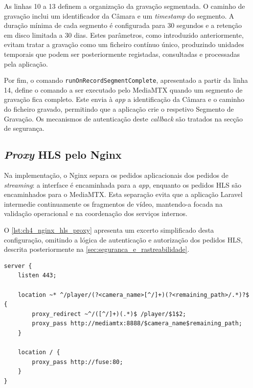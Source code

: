As linhas 10 a 13 definem a organização da gravação segmentada. O caminho de gravação inclui um identificador da Câmara e um \textit{timestamp} do segmento. A duração mínima de cada segmento é configurada para 30 segundos e a retenção em disco limitada a 30 dias. Estes parâmetros, como introduzido anteriormente, evitam tratar a gravação como um ficheiro contínuo único, produzindo unidades temporais que podem ser posteriormente registadas, consultadas e processadas pela aplicação.

Por fim, o comando \texttt{runOnRecordSegmentComplete}, apresentado a partir da linha 14, define o comando a ser executado pelo MediaMTX quando um segmento de gravação fica completo. Este envia à \textit{app} a identificação da Câmara e o caminho do ficheiro gravado, permitindo que a aplicação crie o respetivo Segmento de Gravação. Os mecanismos de autenticação deste \textit{callback} são tratados na secção de segurança.

\subsection{\textit{Proxy} HLS pelo Nginx}
\label{sec:ch4_nginx_hls_proxy}

Na implementação, o Nginx separa os pedidos aplicacionais dos pedidos de \textit{streaming}: a interface é encaminhada para a \textit{app}, enquanto os pedidos \gls{HLS} são encaminhados para o MediaMTX. Esta separação evita que a aplicação Laravel intermedie continuamente os fragmentos de vídeo, mantendo-a focada na validação operacional e na coordenação dos serviços internos.

O \autoref{lst:ch4_nginx_hls_proxy} apresenta um excerto simplificado desta configuração, omitindo a lógica de autenticação e autorização dos pedidos \gls{HLS}, descrita posteriormente na \autoref{sec:seguranca_e_rastreabilidade}.

\par\noindent\begin{minipage}{\linewidth}
\begin{lstlisting}[caption={\textit{Proxy} funcional de pedidos aplicacionais e HLS no Nginx (nginx)},label={lst:ch4_nginx_hls_proxy}]
server {
    listen 443;

    location ~* ^/player/(?<camera_name>[^/]+)(?<remaining_path>/.*)?$ {
        proxy_redirect ~^/([^/]+)(.*)$ /player/$1$2;
        proxy_pass http://mediamtx:8888/$camera_name$remaining_path;
    }

    location / {
        proxy_pass http://fuse:80;
    }
}
\end{lstlisting}
\end{minipage}

